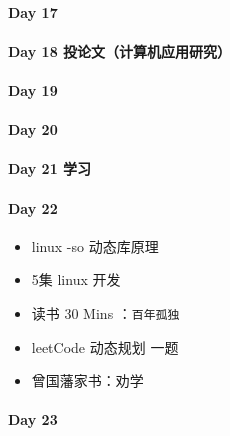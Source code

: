 \documentclass[UTF8,a4paper,8pt]{ctexart}
\begin{document}
 	 \paragraph{Day 17      \quad     }
 	 \paragraph{Day 18   投论文（计算机应用研究）   \quad     }
 	 \paragraph{Day 19      \quad     }
 	 \paragraph{Day 20      \quad     }
 	 \paragraph{Day 21   学习   \quad     }
	 	 
 	 \paragraph{Day 22      \quad     }
	 	 \begin{itemize}[itemindent = 1em]
	 	 	\renewcommand\labelitemi{\makebox[0pt][l]{$\square$}\hspace{1em}} 
	 	 	\renewcommand\labelitemi{\makebox[0pt][l]{$\square$}\raisebox{.15ex}{\hspace{0.1em}$\checkmark$}}		
	 	 	\item   linux -so 动态库原理
	 	 	\item   5集  linux  开发
	 	 	
	 	 	\item   读书  30 Mins	：\verb|百年孤独|
	 	 	\item   leetCode 动态规划 一题
	 	 	
	 	 	\renewcommand\labelitemi{\makebox[0pt][l]{$\square$}\hspace{1em}}
	 	 	\item  曾国藩家书：劝学
	 	 \end{itemize}
 	 \paragraph{Day 23      \quad     }
\end{document}
